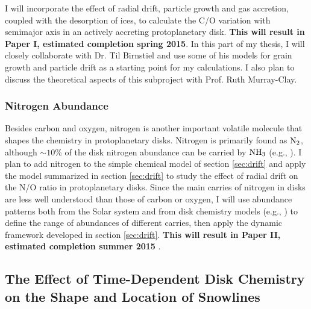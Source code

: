 \documentclass[manuscript]{aastex}
\begin{document}
I will incorporate the effect of radial drift, particle growth and gas accretion, coupled with the desorption of ices, to calculate the C/O variation with semimajor axis in an actively accreting protoplanetary disk.
\textbf{This will result in Paper I, estimated completion spring 2015}. In this part of my thesis, I will closely collaborate with Dr. Til Birnstiel and use some of his models for grain growth and particle drift as a starting point for my calculations. I also plan to discuss the theoretical aspects of this subproject with Prof. Ruth Murray-Clay.

\subsubsection{Nitrogen Abundance}
\label{sec:nitrogen}

Besides carbon and oxygen, nitrogen is another important volatile molecule that shapes the chemistry in protoplanetary disks. Nitrogen is primarily found as $\rm{N}_2$, although $\sim$$10$\% of the disk nitrogen abundance can be carried by $\rm{NH}_3$ (e.g., \citealt{lahuis00}). I plan to add nitrogen to the simple chemical model of section \ref{sec:drift} and apply the model summarized in section \ref{sec:drift} to study the effect of radial drift on the N/O ratio in protoplanetary disks. Since the main carries of nitrogen in disks are less well understood than those of carbon or oxygen, I will use abundance patterns both from the Solar system and from disk chemistry models (e.g., \citealt{schwarz14}) to define the range of abundances of different carries, then apply the dynamic framework developed in section \ref{sec:drift}. \textbf{This will result in Paper II, estimated completion summer 2015} .

\subsection{The Effect of Time-Dependent Disk Chemistry on the Shape and Location of Snowlines}
\label{sec:chemical}
\end{document}
